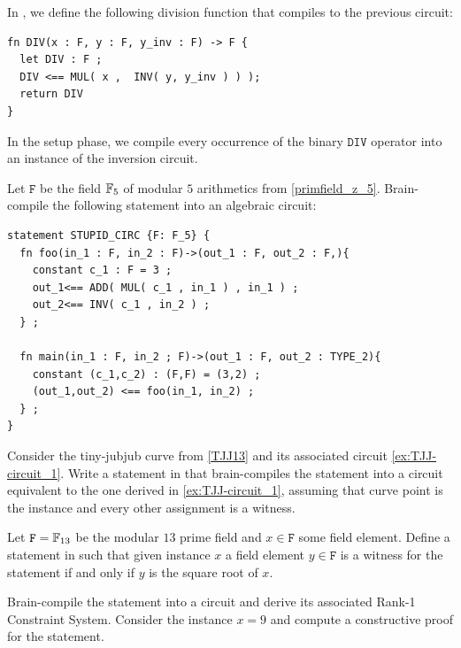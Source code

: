 In , we define the following division function that compiles to the previous circuit:
\begin{lstlisting}
fn DIV(x : F, y : F, y_inv : F) -> F {
  let DIV : F ;
  DIV <== MUL( x ,  INV( y, y_inv ) ) );
  return DIV
}
\end{lstlisting}
In the setup phase, we compile every occurrence of the binary $\mathtt{DIV}$ operator into an instance of the inversion circuit.
\begin{exercise} Let $\mathtt{F}$ be the field $\mathbb{F}_5$ of modular $5$ arithmetics from \examplename{} \ref{primfield_z_5}. Brain-compile the following  statement into an algebraic circuit:
\begin{lstlisting}
statement STUPID_CIRC {F: F_5} {
  fn foo(in_1 : F, in_2 : F)->(out_1 : F, out_2 : F,){
    constant c_1 : F = 3 ;
    out_1<== ADD( MUL( c_1 , in_1 ) , in_1 ) ;
    out_2<== INV( c_1 , in_2 ) ;
  } ;
    
  fn main(in_1 : F, in_2 ; F)->(out_1 : F, out_2 : TYPE_2){
	constant (c_1,c_2) : (F,F) = (3,2) ;
    (out_1,out_2) <== foo(in_1, in_2) ;
  } ;
}
\end{lstlisting}
\end{exercise}
\begin{exercise} Consider the tiny-jubjub curve from \examplename{} \ref{TJJ13} and its associated circuit \ref{ex:TJJ-circuit_1}. Write a statement in  that brain-compiles the statement into a circuit equivalent to the one derived in \ref{ex:TJJ-circuit_1}, assuming that curve point is the instance and every other assignment is a witness. 
\end{exercise}
\begin{exercise} Let $\mathtt{F}=\mathbb{F}_{13}$ be the modular $13$ prime field and $x\in\mathtt{F}$ some field element. Define a statement in  such that given instance $x$ a field element $y\in\mathtt{F}$ is a witness for the statement if and only if $y$ is the square root of $x$.  

Brain-compile the statement into a circuit and derive its associated Rank-1 Constraint System. Consider the instance $x=9$ and compute a constructive proof for the statement. 

\end{exercise}
